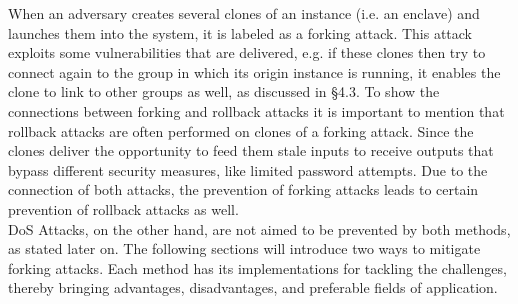 When an adversary creates several clones of an instance (i.e. an enclave) and launches them into the system, it is labeled as a forking attack. This attack exploits some vulnerabilities that are delivered, e.g. if these clones then try to connect again to the group in which its origin instance is running, it enables the clone to link to other groups as well, as discussed in §4.3. 
To show the connections between forking and rollback attacks it is important to mention that rollback attacks are often performed on clones of a forking attack. Since the clones deliver the opportunity to feed them stale inputs to receive outputs that bypass different security measures, like limited password attempts. Due to the connection of both attacks, the prevention of forking attacks leads to certain prevention of rollback attacks as well. \\

DoS Attacks, on the other hand, are not aimed to be prevented by both methods, as stated later on. The following sections will introduce two ways to mitigate forking attacks. Each method has its implementations for tackling the challenges, thereby bringing advantages, disadvantages, and preferable fields of application.





